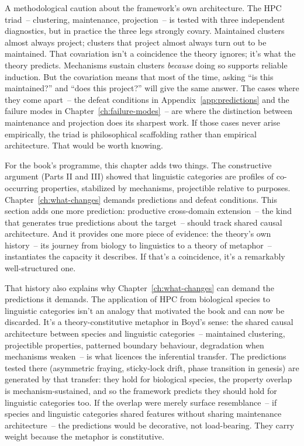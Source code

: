 A methodological caution about the framework's own architecture. The HPC triad~-- clustering, maintenance, projection~-- is tested with three independent diagnostics, but in practice the three legs strongly covary. Maintained clusters almost always project; clusters that project almost always turn out to be maintained. That covariation isn't a coincidence the theory ignores; it's what the theory predicts. Mechanisms sustain clusters \emph{because} doing so supports reliable induction. But the covariation means that most of the time, asking \enquote{is this maintained?} and \enquote{does this project?} will give the same answer. The cases where they come apart~-- the defeat conditions in Appendix~\ref{app:predictions} and the failure modes in Chapter~\ref{ch:failure-modes}~-- are where the distinction between maintenance and projection does its sharpest work. If those cases never arise empirically, the triad is philosophical scaffolding rather than empirical architecture. That would be worth knowing.

For the book's programme, this chapter adds two things. The constructive argument (Parts II and III) showed that linguistic categories are profiles of co-occurring properties, stabilized by mechanisms, projectible relative to purposes. Chapter~\ref{ch:what-changes} demands predictions and defeat conditions. This section adds one more prediction: productive cross-domain extension~-- the kind that generates true predictions about the target~-- should track shared causal architecture. And it provides one more piece of evidence: the theory's own history~-- its journey from biology to linguistics to a theory of metaphor~-- instantiates the capacity it describes. If that's a coincidence, it's a remarkably well-structured one.

That history also explains why Chapter~\ref{ch:what-changes} can demand the predictions it demands. The application of HPC from biological species to linguistic categories isn't an analogy that motivated the book and can now be discarded. It's a theory-constitutive metaphor in Boyd's sense: the shared causal architecture between species and linguistic categories~-- maintained clustering, projectible properties, patterned boundary behaviour, degradation when mechanisms weaken~-- is what licences the inferential transfer. The predictions tested there (asymmetric fraying, sticky-lock drift, phase transition in genesis) are generated by that transfer: they hold for biological species, the property overlap is mechanism-sustained, and so the framework predicts they should hold for linguistic categories too. If the overlap were merely surface resemblance~-- if species and linguistic categories shared features without sharing maintenance architecture~-- the predictions would be decorative, not load-bearing. They carry weight because the metaphor is constitutive.
